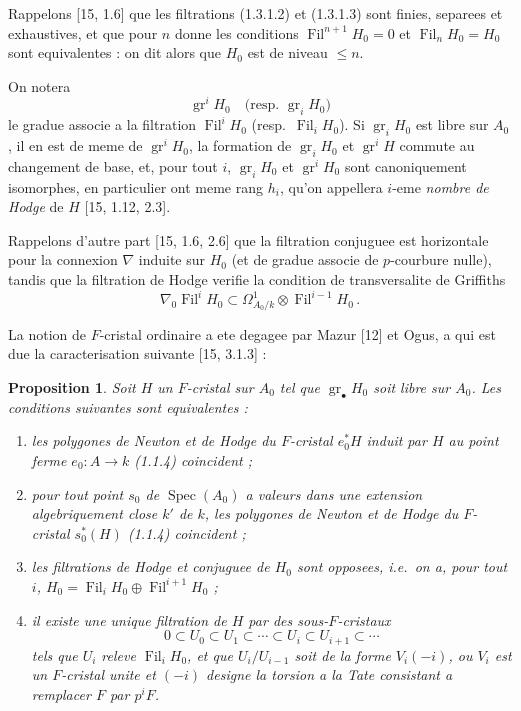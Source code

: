 \documentclass[12pt,a4paper]{article}
\theoremstyle{plain}
\newtheorem{proposition}[theorem]{Proposition}
\theoremstyle{definition}
\theoremstyle{remark}
\DeclareMathOperator{\Spec}{Spec}
\DeclareMathOperator{\gr}{gr}
\DeclareMathOperator{\Fil}{Fil}
\begin{document}
Rappelons [15, 1.6] que les filtrations (1.3.1.2) et (1.3.1.3) sont finies, separees et exhaustives, et que pour $n$ donne les conditions $\Fil^{n+1}H_0 = 0$ et $\Fil_nH_0 = H_0$ sont equivalentes : on dit alors que $H_0$ est de niveau $\leq n$.

On notera
\begin{equation}\label{eq:1.3.1.5}
\gr^iH_0 \quad \text{(resp.\ } \gr_iH_0\text{)}
\end{equation}
le gradue associe a la filtration $\Fil^iH_0$ (resp.\ $\Fil_iH_0$). Si $\gr_iH_0$ est libre sur $A_0$, il en est de meme de $\gr^iH_0$, la formation de $\gr_iH_0$ et $\gr^iH$ commute au changement de base, et, pour tout $i$, $\gr_iH_0$ et $\gr^iH_0$ sont canoniquement isomorphes, en particulier ont meme rang $h_i$, qu'on appellera $i$-eme \emph{nombre de Hodge} de $H$ [15, 1.12, 2.3].

Rappelons d'autre part [15, 1.6, 2.6] que la filtration conjuguee est horizontale pour la connexion $\nabla$ induite sur $H_0$ (et de gradue associe de $p$-courbure nulle), tandis que la filtration de Hodge verifie la condition de transversalite de Griffiths
\begin{equation}\label{eq:1.3.1.6}
\nabla_0\Fil^iH_0 \subset \Omega^1_{A_0/k} \otimes \Fil^{i-1}H_0\,.
\end{equation}

La notion de $F$-cristal ordinaire a ete degagee par Mazur [12] et Ogus, a qui est due la caracterisation suivante [15, 3.1.3] :

\begin{proposition}\label{prop:1.3.2}
Soit $H$ un $F$-cristal sur $A_0$ tel que $\gr_\bullet H_0$ soit libre sur $A_0$. Les conditions suivantes sont equivalentes :
\begin{enumerate}[label=(\roman*)]
\item les polygones de Newton et de Hodge du $F$-cristal $e_0^*H$ induit par $H$ au point ferme $e_0 : A \to k$ (1.1.4) coincident ;
\item[(i$'$)] pour tout point $s_0$ de $\Spec(A_0)$ a valeurs dans une extension algebriquement close $k'$ de $k$, les polygones de Newton et de Hodge du $F$-cristal $s_0^*(H)$ (1.1.4) coincident ;
\item les filtrations de Hodge et conjuguee de $H_0$ sont opposees, i.e.\ on a, pour tout $i$, $H_0 = \Fil_iH_0 \oplus \Fil^{i+1}H_0$ ;
\item il existe une unique filtration de $H$ par des sous-$F$-cristaux
\begin{equation}\label{eq:1.3.2.1}
0 \subset U_0 \subset U_1 \subset \cdots \subset U_i \subset U_{i+1} \subset \cdots
\end{equation}
tels que $U_i$ releve $\Fil_iH_0$, et que $U_i/U_{i-1}$ soit de la forme $V_i(-i)$, ou $V_i$ est un $F$-cristal unite et $(-i)$ designe la torsion a la Tate consistant a remplacer $F$ par $p^iF$.
\end{enumerate}
\end{proposition}
\end{document}
